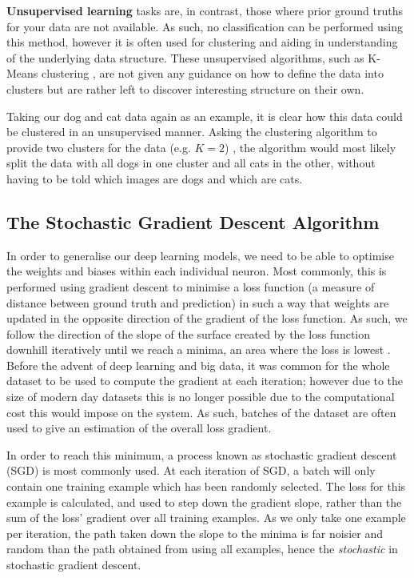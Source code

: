 \textbf{Unsupervised learning} tasks are, in contrast, those where prior ground truths for your data are not available. As such, no classification can be performed using this method, however it is often used for clustering and aiding in understanding of the underlying data structure. These unsupervised algorithms, such as K-Means clustering \cite{hartigan_algorithm_1979}, are not given any guidance on how to define the data into clusters but are rather left to discover interesting structure on their own. 

Taking our dog and cat data again as an example, it is clear how this data could be clustered in an unsupervised manner. Asking the clustering algorithm to provide two clusters for the data  (e.g. $K = 2$) , the algorithm would most likely split the data with all dogs in one cluster and all cats in the other, without having to be told which images are dogs and which are cats. 

\subsection{The Stochastic Gradient Descent Algorithm}\label{ch:Background,sec:DLIntro,sub:stochasticgradientdescent}
In order to generalise our deep learning models, we need to be able to optimise the weights and biases within each individual neuron. Most commonly, this is performed using gradient descent to minimise a loss function (a measure of distance between ground truth and prediction)  in such a way that weights are updated in the opposite direction of the gradient of the loss function. As such, we follow the direction of the slope of the surface created by the loss function downhill iteratively until we reach a minima, an area where the loss is lowest \cite{ruder_overview_2016.}. Before the advent of deep learning and big data, it was common for the whole dataset to be used to compute the gradient at each iteration; however due to the size of modern day datasets this is no longer possible due to the computational cost this would impose on the system. As such, batches of the dataset are often used to give an estimation of the overall loss gradient.

In order to reach this minimum, a process known as stochastic gradient descent (SGD) is most commonly used. At each iteration of SGD, a batch will only contain one training example which has been randomly selected. The loss for this example is calculated, and used to step down the gradient slope, rather than the sum of the loss' gradient over all training examples. As we only take one example per iteration, the path taken down the slope to the minima is far noisier and random than the path obtained from using all examples, hence the \textit{stochastic} in stochastic gradient descent. 

